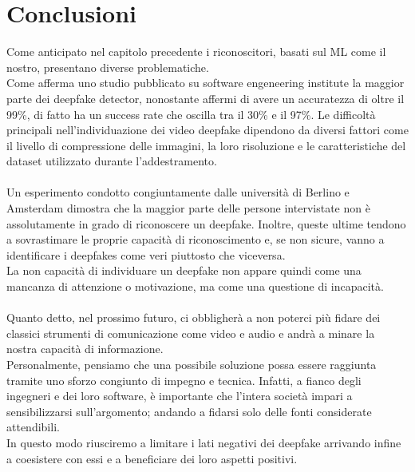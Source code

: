 \documentclass[12pt, a4paper]{article}
\begin{document}
\section{Conclusioni}
Come anticipato nel capitolo precedente i riconoscitori, basati sul ML come il nostro, presentano diverse problematiche.\\
Come afferma uno studio pubblicato su software engeneering institute \cite{bernaciak_2022} la maggior parte dei deepfake detector, nonostante affermi di avere un accuratezza di oltre il 99\%, di fatto ha un success rate che oscilla tra il 30\% e il 97\%. Le difficoltà principali nell'individuazione dei video deepfake dipendono da diversi fattori come il livello di compressione delle immagini, la loro risoluzione e le caratteristiche del dataset utilizzato durante l'addestramento.\\\\
Un esperimento condotto congiuntamente dalle università di Berlino e Amsterdam \cite{KOBIS2021103364} dimostra che la maggior parte delle persone intervistate non è assolutamente in grado di riconoscere un deepfake. Inoltre, queste ultime tendono a sovrastimare le proprie capacità di riconoscimento e, se non sicure, vanno a identificare i deepfakes come veri piuttosto che viceversa.\\La non capacità di individuare un deepfake non appare quindi come una mancanza di attenzione o motivazione, ma come una questione di incapacità.\\\\
Quanto detto, nel prossimo futuro, ci obbligherà a non poterci più fidare dei classici strumenti di comunicazione come video e audio e andrà a minare la nostra capacità di informazione.\\
Personalmente, pensiamo che una possibile soluzione possa essere raggiunta tramite uno sforzo congiunto di impegno e tecnica. Infatti, a fianco degli ingegneri e dei loro software, è importante che l'intera società impari a sensibilizzarsi sull'argomento; andando a fidarsi solo delle fonti considerate attendibili.\\ In questo modo riusciremo a limitare i lati negativi dei deepfake arrivando infine a coesistere con essi e a beneficiare dei loro aspetti positivi. 





\newpage


\end{document}
